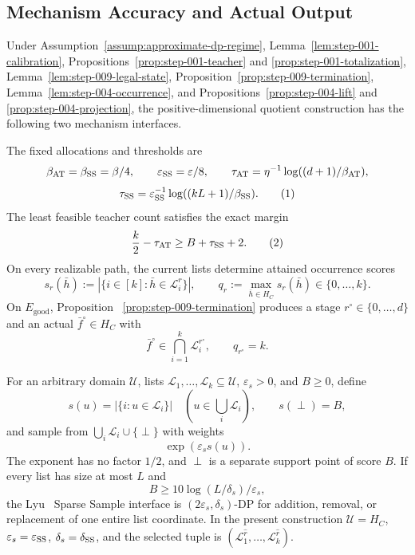 \subsection{Mechanism Accuracy and Actual Output}\label{app:step_010}


\begin{proposition}\label{prop:step-010-interfaces}
Under Assumption~\ref{assump:approximate-dp-regime},
Lemma~\ref{lem:step-001-calibration},
Propositions~\ref{prop:step-001-teacher} and
\ref{prop:step-001-totalization},
Lemma~\ref{lem:step-009-legal-state},
Proposition~\ref{prop:step-009-termination},
Lemma~\ref{lem:step-004-occurrence}, and
Propositions~\ref{prop:step-004-lift} and
\ref{prop:step-004-projection}, the positive-dimensional quotient
construction has the following two mechanism interfaces.

The fixed allocations and thresholds are
\[
 \beta_{\rm AT}=\beta_{\rm SS}=\beta/4,
 \qquad \varepsilon_{\rm SS}=\varepsilon/8,
 \qquad
 \tau_{\rm AT}=\eta^{-1}\log((d+1)/\beta_{\rm AT}),
\]
\[
 \tau_{\rm SS}
 =\varepsilon_{\rm SS}^{-1}
   \log((kL+1)/\beta_{\rm SS}).
\tag{1}
\]
The least feasible teacher count satisfies the exact margin
\[
 \frac{k}{2}-\tau_{\rm AT}
 \geq B+\tau_{\rm SS}+2.
\tag{2}
\]
On every realizable path, the current lists determine attained occurrence
scores
\[
 s_r(\bar h):=|\{i\in[k]:\bar h\in\mathcal L_i^r\}|,
 \qquad
 q_r:=\max_{\bar h\in H_C}s_r(\bar h)
 \in\{0,\ldots,k\}.
\tag{3}
\]
On \(E_{\mathrm{good}}\), Proposition
~\ref{prop:step-009-termination} produces a stage
\(r^\circ\in\{0,\ldots,d\}\) and an actual
\(\bar f^\circ\in H_C\) with
\[
 \bar f^\circ\in\bigcap_{i=1}^k\mathcal L_i^{r^\circ},
 \qquad q_{r^\circ}=k.
\tag{4}
\]

For an arbitrary domain \(\mathcal U\), lists
\(\mathcal L_1,\ldots,\mathcal L_k\subseteq\mathcal U\),
\(\varepsilon_s>0\), and \(B\ge0\), define
\[
 s(u)=|\{i:u\in\mathcal L_i\}|\quad
 (u\in\textstyle\bigcup_i\mathcal L_i),
 \qquad s(\perp)=B,
\]
and sample from \(\bigcup_i\mathcal L_i\cup\{\perp\}\) with weights
\[
 \exp(\varepsilon_s s(u)).
 \tag{5}
\]
The exponent has no factor \(1/2\), and \(\perp\) is a separate support
point of score \(B\).  If every list has size at most \(L\) and
\[
 B\geq10\log(L/\delta_s)/\varepsilon_s,
\]
the Lyu~\citep{lyu2025} Sparse Sample interface is
\((2\varepsilon_s,\delta_s)\)-DP for addition, removal, or replacement of
one entire list coordinate.  In the present construction
\(\mathcal U=H_C\), \(\varepsilon_s=\varepsilon_{\rm SS}\),
\(\delta_s=\delta_{\rm SS}\), and the selected tuple is
\((\mathcal L_1^{\widehat r},\ldots,\mathcal L_k^{\widehat r})\).


\end{proposition}
